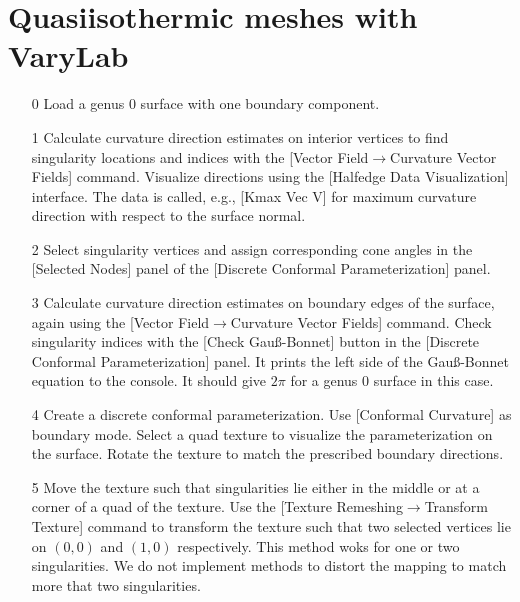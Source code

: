 \documentclass[Thesis.tex]{subfiles}
\begin{document}
\section{Quasiisothermic meshes with {\sc VaryLab}}
\label{sec:quasiisothermic_varylab}

\begin{itemize}
\item[0] Load a genus $0$ surface with one boundary component.
\item[1] Calculate curvature direction estimates on interior vertices to find singularity locations and indices with the [Vector Field$\to$Curvature Vector Fields] command. Visualize directions using the [Halfedge Data Visualization] interface. The data is called, e.g., [Kmax Vec V] for maximum curvature direction with respect to the surface normal.
\item[2] Select singularity vertices and assign corresponding cone angles in the [Selected Nodes] panel of the [Discrete Conformal Parameterization] panel.
\item[3] Calculate curvature direction estimates on boundary edges of the surface, again using the [Vector Field$\to$Curvature Vector Fields] command. Check singularity indices with the [Check Gau{\ss}-Bonnet] button in the [Discrete Conformal Parameterization] panel. It prints the left side of the Gau{\ss}-Bonnet equation to the console. It should give $2\pi$ for a genus $0$ surface in this case.

\begin{center}
\begin{minipage}{0.9\linewidth}
            \centering
\end{minipage}
\end{center}     
            
\item[4] Create a discrete conformal parameterization. Use [Conformal Curvature] as boundary mode. Select a quad texture to visualize the parameterization on the surface. Rotate the texture to match the prescribed boundary directions.
\item[5] Move the texture such that singularities lie either in the middle or at a corner of a quad of the texture. Use the [Texture Remeshing$\to$Transform Texture] command to transform the texture such that two selected vertices lie on $(0,0)$ and $(1,0)$ respectively. This method woks for one or two singularities. We do not implement methods to distort the mapping to match more that two singularities.


\end{itemize}
\end{document}
